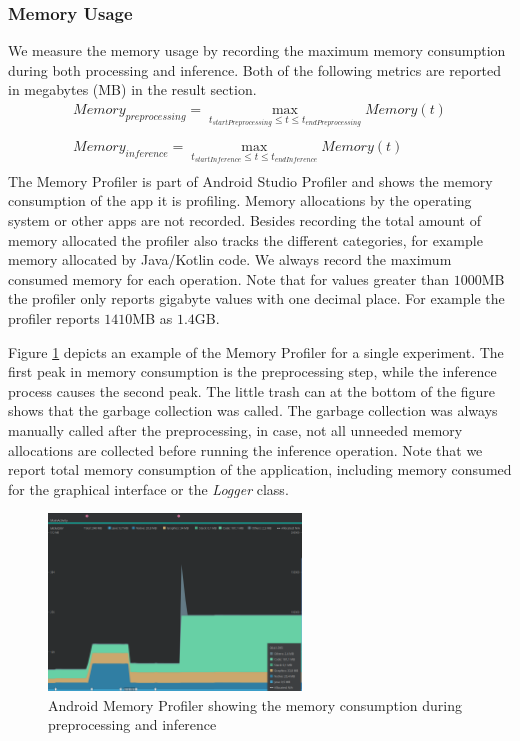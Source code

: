 \subsubsection{Memory Usage}
We measure the memory usage by recording the maximum memory consumption during both processing and inference. Both of the following metrics are reported in megabytes (MB) in the result section.
\begin{equation*}
\begin{gathered}
Memory_{preprocessing} = \max\limits_{t_{startPreprocessing} \leq t \leq t_{endPreprocessing}} Memory(t)\\\\
Memory_{inference} = \max\limits_{t_{startInference} \leq t \leq t_{endInference}} Memory(t)\\
\end{gathered}
\end{equation*}
The Memory Profiler is part of Android Studio Profiler and shows the memory consumption of the app it is profiling. Memory allocations by the operating system or other apps are not recorded. Besides recording the total amount of memory allocated the profiler also tracks the different categories, for example memory allocated by Java/Kotlin code. We always record the maximum consumed memory for each operation.
Note that for values greater than $1000$MB the profiler only reports gigabyte values with one decimal place. For example the profiler reports $1410$MB as $1.4$GB.

Figure \ref{fig:prof_mem} depicts an example of the Memory Profiler for a single experiment. The first peak in memory consumption is the preprocessing step, while the inference process causes the second peak.
The little trash can at the bottom of the figure shows that the garbage collection was called. The garbage collection was always manually called after the preprocessing, in case, not all unneeded memory allocations are collected before running the inference operation. 
Note that we report total memory consumption of the application, including memory consumed for the graphical interface or the \emph{Logger} class.
\begin{figure}[H]
\centering
\includegraphics[width=0.6\textwidth]{./Bilder/profiler_MEM}
\caption{Android Memory Profiler showing the memory consumption during preprocessing and inference}
\label{fig:prof_mem}
\end{figure}

